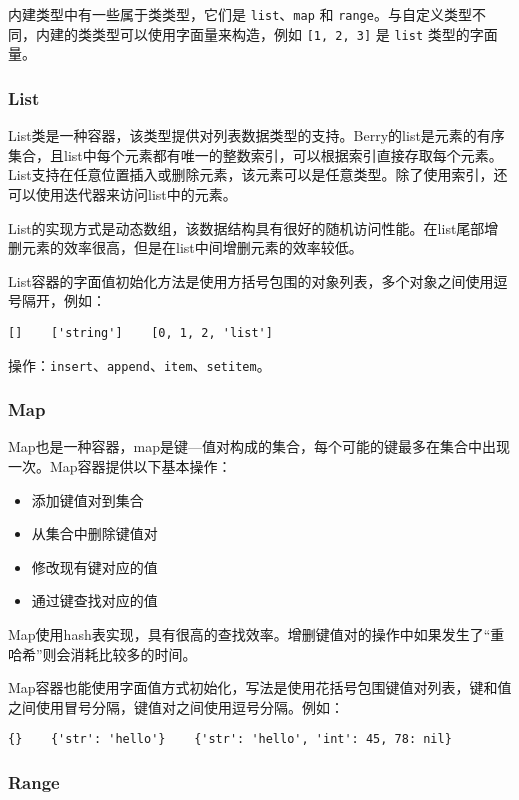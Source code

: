 内建类型中有一些属于类类型，它们是 \texttt{list}、\texttt{map} 和 \texttt{range}。与自定义类型不同，内建的类类型可以使用字面量来构造，例如 \texttt{[1, 2, 3]} 是 \texttt{list} 类型的字面量。

\subsubsection{List}

List类是一种容器，该类型提供对列表数据类型的支持。Berry的list是元素的有序集合，且list中每个元素都有唯一的整数索引，可以根据索引直接存取每个元素。List支持在任意位置插入或删除元素，该元素可以是任意类型。除了使用索引，还可以使用迭代器来访问list中的元素。

List的实现方式是动态数组，该数据结构具有很好的随机访问性能。在list尾部增删元素的效率很高，但是在list中间增删元素的效率较低。

List容器的字面值初始化方法是使用方括号包围的对象列表，多个对象之间使用逗号隔开，例如：
\begin{lstlisting}[language=berry, numbers=none]
[]    ['string']    [0, 1, 2, 'list']
\end{lstlisting}

操作：\texttt{insert}、\texttt{append}、\texttt{item}、\texttt{setitem}。

\subsubsection{Map}

Map也是一种容器，map是键—值对构成的集合，每个可能的键最多在集合中出现一次。Map容器提供以下基本操作：
\begin{itemize}
    \item 添加键值对到集合
    \item 从集合中删除键值对
    \item 修改现有键对应的值
    \item 通过键查找对应的值
\end{itemize}

Map使用hash表实现，具有很高的查找效率。增删键值对的操作中如果发生了“重哈希”则会消耗比较多的时间。

Map容器也能使用字面值方式初始化，写法是使用花括号包围键值对列表，键和值之间使用冒号分隔，键值对之间使用逗号分隔。例如：
\begin{lstlisting}[language=berry, numbers=none]
{}    {'str': 'hello'}    {'str': 'hello', 'int': 45, 78: nil}
\end{lstlisting}

\subsubsection{Range}

